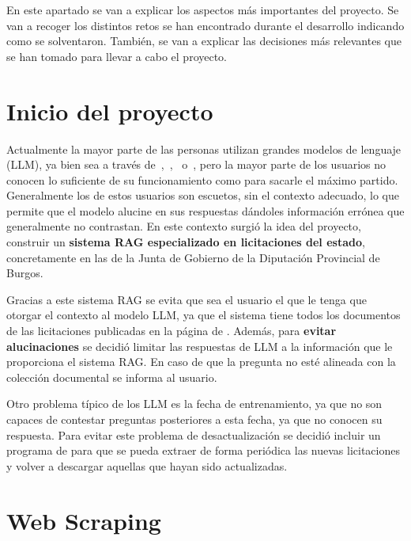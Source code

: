 
En este apartado se van a explicar los aspectos más importantes del proyecto. Se van a recoger los distintos retos se han encontrado durante el desarrollo indicando como se solventaron. También, se van a explicar las decisiones más relevantes que se han tomado para llevar a cabo el proyecto. 

\section{Inicio del proyecto}

Actualmente la mayor parte de las personas utilizan grandes modelos de lenguaje (LLM), ya bien sea a través de~,~,~ o~, pero la mayor parte de los usuarios no conocen lo suficiente de su funcionamiento como para sacarle el máximo partido. Generalmente los  de estos usuarios son escuetos, sin el contexto adecuado, lo que permite que el modelo alucine en sus respuestas dándoles información errónea que generalmente no contrastan. En este contexto surgió la idea del proyecto, construir un \textbf{sistema RAG especializado en licitaciones del estado}, concretamente en las de la Junta de Gobierno de la Diputación Provincial de Burgos.

Gracias a este sistema RAG se evita que sea el usuario el que le tenga que otorgar el contexto al modelo LLM, ya que el sistema tiene todos los documentos de las licitaciones publicadas en la página de \contsec{}. Además, para \textbf{evitar alucinaciones} se decidió limitar las respuestas de LLM a la información que le proporciona el sistema RAG. En caso de que la pregunta no esté alineada con la colección documental se informa al usuario.

Otro problema típico de los LLM es la fecha de entrenamiento, ya que no son capaces de contestar preguntas posteriores a esta fecha, ya que no conocen su respuesta. Para evitar este problema de desactualización se decidió incluir un programa de  para que se pueda extraer de forma periódica las nuevas licitaciones y volver a descargar aquellas que hayan sido actualizadas. 

\section{Web Scraping}

